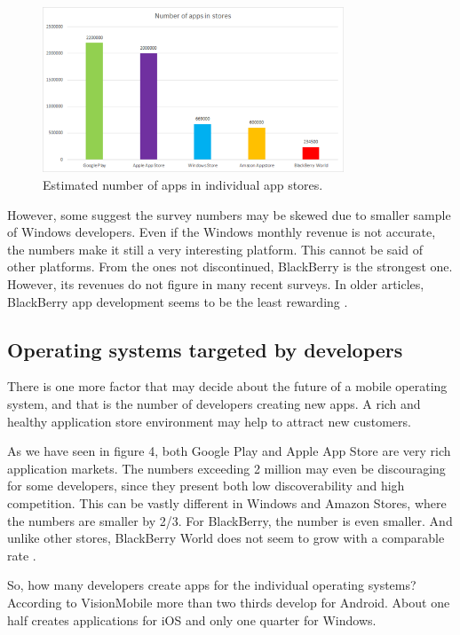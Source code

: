 \documentclass[english,master,public,dept460,male,cpdeclaration,oneside]{diploma}
\begin{document}
\begin{figure}
	\centering\includegraphics[width=0.8\textwidth]{Figures/appsInStores.png}
	\caption{Estimated number of apps in individual app stores.}
	\label{figure:appsInStoress}
\end{figure}

However, some \cite{betanewsWinRevenue} suggest the survey numbers may be skewed due to smaller sample of Windows developers. Even if the Windows monthly revenue is not accurate, the numbers make it still a very interesting platform. This cannot be said of other platforms. From the ones not discontinued, BlackBerry is the strongest one. However, its revenues do not figure in many recent surveys. In older articles, BlackBerry app development seems to be the least rewarding \cite{bgrBBRevenues}. 

\subsection{Operating systems targeted by developers}
There is one more factor that may decide about the future of a mobile operating system, and that is the number of developers creating new apps. A rich and healthy application store environment may help to attract new customers. 

As we have seen in figure 4, both Google Play and Apple App Store are very rich application markets. The numbers exceeding 2 million may even be discouraging for some developers, since they present both low discoverability and high competition. This can be vastly different in Windows and Amazon Stores, where the numbers are smaller by 2/3. For BlackBerry, the number is even smaller. And unlike other stores, BlackBerry World does not seem to grow with a comparable rate \cite{wikiBBWorld}. 

So, how many developers create apps for the individual operating systems? According to VisionMobile \cite{devEconomics} more than two thirds develop for Android. About one half creates applications for iOS and only one quarter for Windows.
\end{document}
